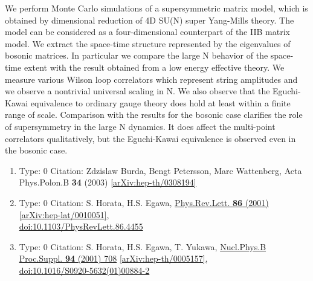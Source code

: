 \documentclass[a4paper,10pt]{article}
\begin{document}
\begin{enumerate}
We perform Monte Carlo simulations of a supersymmetric matrix model, which is obtained by dimensional reduction of 4D SU(N) super Yang-Mills theory. The model can be considered as a four-dimensional counterpart of the IIB matrix model. We extract the space-time structure represented by the eigenvalues of bosonic matrices. In particular we compare the large N behavior of the space-time extent with the result obtained from a low energy effective theory. We measure various Wilson loop correlators which represent string amplitudes and we observe a nontrivial universal scaling in N. We also observe that the Eguchi-Kawai equivalence to ordinary gauge theory does hold at least within a finite range of scale. Comparison with the results for the bosonic case clarifies the role of supersymmetry in the large N dynamics. It does affect the multi-point correlators qualitatively, but the Eguchi-Kawai equivalence is observed even in the bosonic case.
\begin{enumerate}
  \item Type: 0 Citation: Zdzislaw Burda, Bengt Petersson, Marc Wattenberg, Acta Phys.Polon.B {\bf 34} (2003)   \href{https://arxiv.org/abs/hep-th/0308194}{[arXiv:hep-th/0308194]}
  \item Type: 0 Citation: S. Horata, H.S. Egawa, \href{https://www.doi.org/10.1103/PhysRevLett.86.4455}{Phys.Rev.Lett. {\bf 86} (2001) }  \href{https://arxiv.org/abs/hep-lat/0010051}{[arXiv:hep-lat/0010051]},\\\href{https://www.doi.org/10.1103/PhysRevLett.86.4455}{doi:10.1103/PhysRevLett.86.4455}
  \item Type: 0 Citation: S. Horata, H.S. Egawa, T. Yukawa, \href{https://www.doi.org/10.1016/S0920-5632(01)00884-2}{Nucl.Phys.B Proc.Suppl. {\bf 94} (2001) 708}  \href{https://arxiv.org/abs/hep-th/0005157}{[arXiv:hep-th/0005157]},\\\href{https://www.doi.org/10.1016/S0920-5632(01)00884-2}{doi:10.1016/S0920-5632(01)00884-2}

\end{enumerate}
\end{enumerate}
\end{document}
